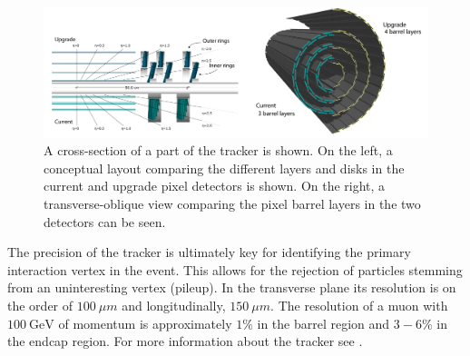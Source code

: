 \begin{figure}[!tp]
    \centering
    \includegraphics[width=\textwidth]{figures/tracker_layout_ng+og.pdf}
    \caption[
       \CMS tracker diagram.
    ]{
        A cross-section of a part of the \CMS tracker is shown.
        On the left, a conceptual layout comparing the different layers and disks in the current and upgrade pixel detectors is shown. On the right, a transverse-oblique view comparing the pixel barrel layers in the two detectors can be seen.
        \cite{trackerPerf}
    }
    \label{fig:tracker}
\end{figure}


The precision of the tracker is ultimately key for identifying the primary interaction vertex in the event. This allows for the rejection of particles stemming from an uninteresting vertex (pileup). In the transverse plane its resolution is on the order of \ensuremath{\SI{100}{\mu m}} and longitudinally, \ensuremath{\SI{150}{\mu m}}. The resolution of a muon with \ensuremath{\SI{100}{\GeV}} of momentum is approximately \ensuremath{1\%} in the barrel region and \ensuremath{3-6\%} in the endcap region. For more information about the tracker see \cite{trackerPerf}.

